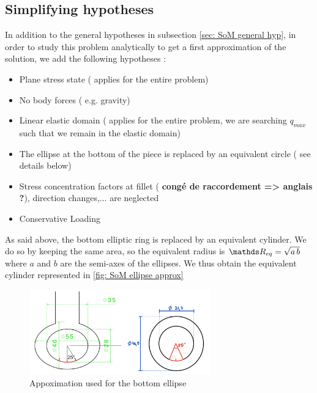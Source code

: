 \documentclass[12pt]{article}
\begin{document}
\subsection{Simplifying hypotheses}
In addition to the general hypotheses in subsection \ref{sec: SoM general hyp}, in order to study this problem analytically to get a first approximation of the solution, we add the following hypotheses : 
\begin{itemize}[itemsep = 1pt]
    \item Plane stress state ( applies for the entire problem)
    \item No body forces ( e.g. gravity)
    \item Linear elastic domain ( applies for the entire problem, we are searching $q_{max}$ such that we remain in the elastic domain)
    \item The ellipse at the bottom of the piece is replaced by an equivalent circle ( see details below)
    \item Stress concentration factors at fillet ( \textbf{congé de raccordement => anglais ?}), direction changes,... are neglected 
    \item Conservative Loading
\end{itemize}

As said above, the bottom elliptic ring is replaced by an equivalent cylinder. We do so by keeping the same area, so the equivalent radius is $\R_{eq} = \sqrt{a\, b}$ where $a$ and $b$ are the semi-axes of the ellipses. We thus obtain the equivalent cylinder represented in \autoref{fig: SoM ellipse approx}

\begin{figure}[H]
    \centering
    \includegraphics[width=0.7\textwidth]{Report/figures/SoM_ellipse_approx.png} 
    \caption{Appoximation used for the bottom ellipse}
    \label{fig: SoM ellipse approx}
\end{figure}
\end{document}
